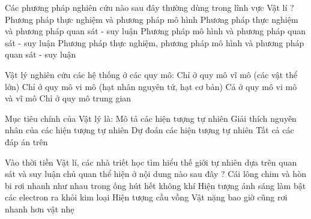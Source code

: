 \begin{ex}
Các phương pháp nghiên cứu nào sau đây thường dùng trong lĩnh vực Vật lí ?
\choice
{Phương pháp thực nghiệm và phương pháp mô hình}
{Phương pháp thực nghiệm và phương pháp quan sát - suy luận}
{Phương pháp mô hình và phương pháp quan sát - suy luận}
{\True Phương pháp thực nghiệm, phương pháp mô hình và phương pháp quan sát - suy luận}
\end{ex}

\begin{ex}
Vật lý nghiên cứu các hệ thống ở các quy mô:
\choice
{Chỉ ở quy mô vĩ mô (các vật thể lớn)}
{Chỉ ở quy mô vi mô (hạt nhân nguyên tử, hạt cơ bản)}
{\True Cả ở quy mô vi mô và vĩ mô}
{Chỉ ở quy mô trung gian}
\end{ex}

\begin{ex}
Mục tiêu chính của Vật lý là:
\choice
{Mô tả các hiện tượng tự nhiên}
{Giải thích nguyên nhân của các hiện tượng tự nhiên}
{Dự đoán các hiện tượng tự nhiên}
{\True Tất cả các đáp án trên}
\end{ex}

\begin{ex}
Vào thời tiền Vật lí, các nhà triết học tìm hiểu thế giới tự nhiên dựa trên quan sát và suy luận chủ quan thể hiện ở nội dung nào sau đây ?
\choice
{Cái lông chim và hòn bi rơi nhanh như nhau trong ống hút hết không khí}
{Hiện tượng ánh sáng làm bật các electron ra khỏi kim loại}
{Hiện tượng cầu vồng}
{\True Vật nặng bao giờ cũng rơi nhanh hơn vật nhẹ}
\end{ex}

